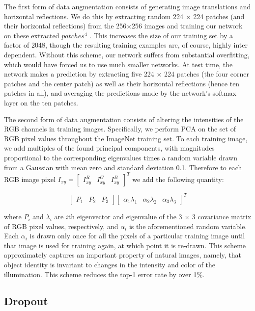 \documentclass[12pt,a4paper,UTF8,twoside]{book}
\begin{document}
The first form of data augmentation consists of generating image translations and horizontal reflections. We do this by extracting random 224 × 224 patches (and their horizontal reflections) from the 256×256 images and training our network on these extracted \(patches^4\) . This increases the size of our training set by a factor of 2048, though the resulting training examples are, of course, highly inter dependent. Without this scheme, our network suffers from substantial overfitting, which would have forced us to use much smaller networks. At test time, the network makes a prediction by extracting five 224 × 224 patches (the four corner patches and the center patch) as well as their horizontal reflections (hence ten patches in all), and averaging the predictions made by the network's softmax layer on the ten patches.

The second form of data augmentation consists of altering the intensities of the RGB channels in training images. Specifically, we perform PCA on the set of RGB pixel values throughout the ImageNet training set. To each training image, we add multiples of the found principal components, with magnitudes proportional to the corresponding eigenvalues times a random variable drawn from a Gaussian with mean zero and standard deviation 0.1. Therefore to each RGB image pixel \(I_{xy} = \left[ \begin{matrix} I^R_{xy} & I^G_{xy} & I^B_{xy} \end{matrix} \right]^T\) we add the following quantity:

\[
\left[ \begin{matrix} P_1 & P_2 & P_3 \end{matrix} \right]\left[ \begin{matrix} \alpha_1\lambda_1 & \alpha_2\lambda_2 & \alpha_3\lambda_3 \end{matrix} \right]^T
\]

where \(P_i\) and \(\lambda_i\) are \(i\)th eigenvector and eigenvalue of the 3 × 3 covariance matrix of RGB pixel values, respectively, and \(\alpha_i\) is the aforementioned random variable. Each \(\alpha_i\) is drawn only once for all the pixels of a particular training image until that image is used for training again, at which point it is re-drawn. This scheme approximately captures an important property of natural images, namely, that object identity is invariant to changes in the intensity and color of the illumination. This scheme reduces the top-1 error rate by over 1\%.

\hypertarget{dropout}{%
\subsection{Dropout}\label{dropout}}
\end{document}
